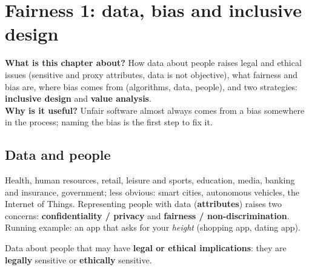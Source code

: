 \documentclass[11pt,a4paper,openany]{book}
\begin{document}
\chapter{Fairness 1: data, bias and inclusive design}

\begin{rembox}[title={In a nutshell}]
\textbf{What is this chapter about?} How data about people raises legal and ethical issues
(sensitive and proxy attributes, data is not objective), what fairness and bias are, where bias
comes from (algorithms, data, people), and two strategies: \textbf{inclusive design} and
\textbf{value analysis}. \\
\textbf{Why is it useful?} Unfair software almost always comes from a bias somewhere in the
process; naming the bias is the first step to fix it.
\end{rembox}


\section{Data and people}

\begin{rembox}[title={Where software works with data about people}]
Health, human resources, retail, leisure and sports, education, media, banking and insurance,
government; less obvious: smart cities, autonomous vehicles, the Internet of Things. Representing
people with data (\textbf{attributes}) raises two concerns: \textbf{confidentiality / privacy}
and \textbf{fairness / non-discrimination}. Running example: an app that asks for your
\emph{height} (shopping app, dating app).
\end{rembox}

\begin{defnbox}[title={Sensitive attributes}]
Data about people that may have \textbf{legal or ethical implications}: they are
\textbf{legally} sensitive or \textbf{ethically} sensitive.
\end{defnbox}
\end{document}
